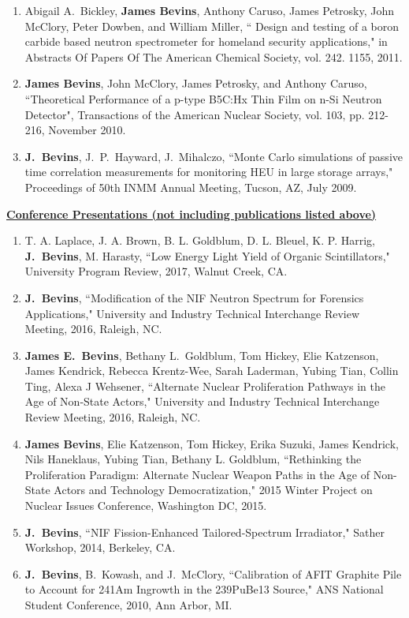 \begin{enumerate}
  \item Abigail A.\ Bickley, \textbf{James Bevins}, Anthony Caruso, James Petrosky, John McClory, Peter Dowben, and William Miller, `` Design and testing of a boron carbide based neutron spectrometer for homeland security applications," in Abstracts Of Papers Of The American Chemical Society, vol. 242. 1155, 2011.

  \item \textbf{James Bevins}, John McClory, James Petrosky, and Anthony Caruso, ``Theoretical Performance of a p-type B5C:Hx Thin Film on n-Si Neutron Detector", Transactions of the American Nuclear Society, vol. 103, pp. 212-216, November 2010. 
  
  \item \textbf{J.\ Bevins}, J.\ P.\ Hayward, J.\ Mihalczo, ``Monte Carlo simulations of passive time correlation measurements for monitoring HEU in large storage arrays," Proceedings of 50th INMM Annual Meeting, Tucson, AZ, July 2009.
\end{enumerate}

\underline{\textbf{Conference Presentations (not including publications listed above)}}

\begin{enumerate}
  \item T. A. Laplace, J. A. Brown, B. L. Goldblum, D. L. Bleuel, K. P. Harrig, \textbf{J.\ Bevins}, M. Harasty, ``Low Energy Light Yield of Organic Scintillators," University Program Review, 2017, Walnut Creek, CA.
  
  \item \textbf{J.\ Bevins}, ``Modification of the NIF Neutron Spectrum for Forensics Applications," University and Industry Technical Interchange Review Meeting, 2016, Raleigh, NC.
  
  \item \textbf{James E.\ Bevins}, Bethany L.\ Goldblum, Tom Hickey, Elie Katzenson, James Kendrick, Rebecca Krentz-Wee, Sarah Laderman, Yubing Tian, Collin Ting, Alexa J Wehsener, ``Alternate Nuclear Proliferation Pathways in the Age of Non-State Actors," University and Industry Technical Interchange Review Meeting, 2016, Raleigh, NC.

  \item \textbf{James Bevins}, Elie Katzenson, Tom Hickey, Erika Suzuki, James Kendrick, Nils Haneklaus, Yubing Tian, Bethany L. Goldblum, ``Rethinking the Proliferation Paradigm: Alternate Nuclear Weapon Paths in the Age of Non-State Actors and Technology Democratization," 2015 Winter Project on Nuclear Issues Conference, Washington DC, 2015.
  
  \item \textbf{J.\ Bevins}, ``NIF Fission-Enhanced Tailored-Spectrum Irradiator," Sather Workshop, 2014, Berkeley, CA.
  
  \item \textbf{J.\ Bevins}, B.\ Kowash, and J.\ McClory, ``Calibration of AFIT Graphite Pile to Account for 241Am Ingrowth in the 239PuBe13 Source," ANS National Student Conference, 2010, Ann Arbor, MI.
\end{enumerate}

